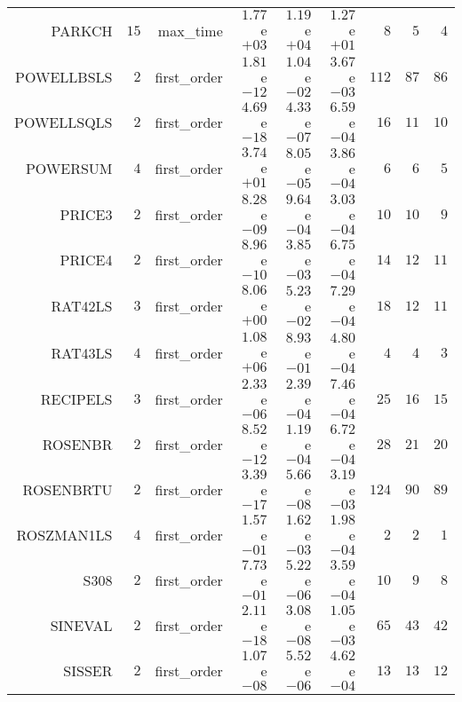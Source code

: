 \begin{longtable}{rrrrrrrrr}
PARKCH & \(    15\) & max\_time & \( 1.77\)e\(+03\) & \( 1.19\)e\(+04\) & \( 1.27\)e\(+01\) & \(     8\) & \(     5\) & \(     4\) \\
POWELLBSLS & \(     2\) & first\_order & \( 1.81\)e\(-12\) & \( 1.04\)e\(-02\) & \( 3.67\)e\(-03\) & \(   112\) & \(    87\) & \(    86\) \\
POWELLSQLS & \(     2\) & first\_order & \( 4.69\)e\(-18\) & \( 4.33\)e\(-07\) & \( 6.59\)e\(-04\) & \(    16\) & \(    11\) & \(    10\) \\
POWERSUM & \(     4\) & first\_order & \( 3.74\)e\(+01\) & \( 8.05\)e\(-05\) & \( 3.86\)e\(-04\) & \(     6\) & \(     6\) & \(     5\) \\
PRICE3 & \(     2\) & first\_order & \( 8.28\)e\(-09\) & \( 9.64\)e\(-04\) & \( 3.03\)e\(-04\) & \(    10\) & \(    10\) & \(     9\) \\
PRICE4 & \(     2\) & first\_order & \( 8.96\)e\(-10\) & \( 3.85\)e\(-03\) & \( 6.75\)e\(-04\) & \(    14\) & \(    12\) & \(    11\) \\
RAT42LS & \(     3\) & first\_order & \( 8.06\)e\(+00\) & \( 5.23\)e\(-02\) & \( 7.29\)e\(-04\) & \(    18\) & \(    12\) & \(    11\) \\
RAT43LS & \(     4\) & first\_order & \( 1.08\)e\(+06\) & \( 8.93\)e\(-01\) & \( 4.80\)e\(-04\) & \(     4\) & \(     4\) & \(     3\) \\
RECIPELS & \(     3\) & first\_order & \( 2.33\)e\(-06\) & \( 2.39\)e\(-04\) & \( 7.46\)e\(-04\) & \(    25\) & \(    16\) & \(    15\) \\
ROSENBR & \(     2\) & first\_order & \( 8.52\)e\(-12\) & \( 1.19\)e\(-04\) & \( 6.72\)e\(-04\) & \(    28\) & \(    21\) & \(    20\) \\
ROSENBRTU & \(     2\) & first\_order & \( 3.39\)e\(-17\) & \( 5.66\)e\(-08\) & \( 3.19\)e\(-03\) & \(   124\) & \(    90\) & \(    89\) \\
ROSZMAN1LS & \(     4\) & first\_order & \( 1.57\)e\(-01\) & \( 1.62\)e\(-03\) & \( 1.98\)e\(-04\) & \(     2\) & \(     2\) & \(     1\) \\
S308 & \(     2\) & first\_order & \( 7.73\)e\(-01\) & \( 5.22\)e\(-06\) & \( 3.59\)e\(-04\) & \(    10\) & \(     9\) & \(     8\) \\
SINEVAL & \(     2\) & first\_order & \( 2.11\)e\(-18\) & \( 3.08\)e\(-08\) & \( 1.05\)e\(-03\) & \(    65\) & \(    43\) & \(    42\) \\
SISSER & \(     2\) & first\_order & \( 1.07\)e\(-08\) & \( 5.52\)e\(-06\) & \( 4.62\)e\(-04\) & \(    13\) & \(    13\) & \(    12\) \\

\end{longtable}
